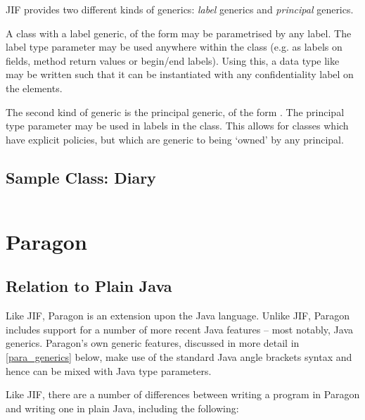JIF provides two different kinds of generics: \textit{label} generics and \textit{principal} generics.

A class with a label generic, of the form  may be parametrised by any label. The label type parameter may be used anywhere within the class (e.g. as labels on fields, method return values or begin/end labels). Using this, a data type like  may be written such that it can be instantiated with any confidentiality label on the elements.

The second kind of generic is the principal generic, of the form . The principal type parameter may be used in labels in the class. This allows for classes which have explicit policies, but which are generic to being `owned' by any principal.

\newpage

\subsection{Sample Class: Diary}

\inputminted{java}{content/code_sections/jif_para_bg/Diary.jif}

\newpage

\section{Paragon}

\subsection{Relation to Plain Java}

Like JIF, Paragon is an extension upon the Java language. Unlike JIF, Paragon includes support for a number of more recent Java features -- most notably, Java generics. Paragon's own generic features, discussed in more detail in \ref{para_generics} below, make use of the standard Java angle brackets syntax and hence can be mixed with Java type parameters.

Like JIF, there are a number of differences between writing a program in Paragon and writing one in plain Java, including the following:


